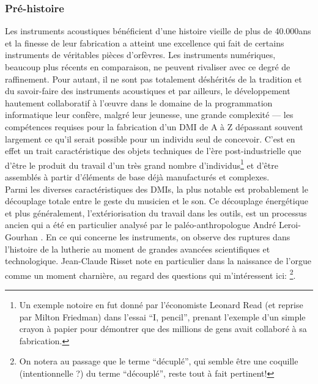 \subsubsection{Pré-histoire}
\label{sec:ephemeral:origins:prehistory}

\noindent Les instruments acoustiques bénéficient d'une histoire vieille de plus de 40.000ans \cite{conard_new_2009} et la finesse de leur fabrication a atteint une excellence qui fait de certains instruments de véritables pièces d'orfèvres. Les instruments numériques, beaucoup plus récents en comparaison, ne peuvent rivaliser avec ce degré de raffinement. Pour autant, il ne sont pas totalement déshérités de la tradition et du savoir-faire des instruments acoustiques et par ailleurs, le développement hautement collaboratif à l'œuvre dans le domaine de la programmation informatique leur confère, malgré leur jeunesse, une grande complexité — les compétences requises pour la fabrication d'un \gls{DMI} de A à Z dépassant souvent largement ce qu'il serait possible pour un individu seul de concevoir. C'est en effet un trait caractéristique des objets techniques de l'ère post-industrielle que d'être le produit du travail d'un très grand nombre d'individus\footnote{Un exemple notoire en fut donné par l'économiste Leonard Read (et reprise par Milton Friedman) dans l'essai ``I, pencil''\cite{read_i_1958}, prenant l'exemple d'un simple crayon à papier pour démontrer que des millions de gens avait collaboré à sa fabrication.} et d'être assemblés à partir d'éléments de base déjà manufacturés et complexes.\\
\indent Parmi les diverses caractéristiques des \glspl{DMI}, la plus notable est probablement le découplage totale entre le geste du musicien et le son. Ce découplage énergétique et plus généralement, l'extériorisation du travail dans les outils, est un processus ancien qui a été en particulier analysé par le paléo-anthropologue André Leroi-Gourhan \cite{leroi-gourhan_geste_1964}. En ce qui concerne les instruments, on observe des ruptures dans l'histoire de la lutherie au moment de grandes avancées scientifiques et technologique. Jean-Claude Risset note en particulier dans \cite{genevois_les_1999} la naissance de l'orgue comme un moment charnière, au regard des questions qui m'intéressent ici: \footnote{On notera au passage que le terme ``décuplé'', qui semble être une coquille (intentionnelle ?) du terme ``découplé'', reste tout à fait pertinent!}.\\

